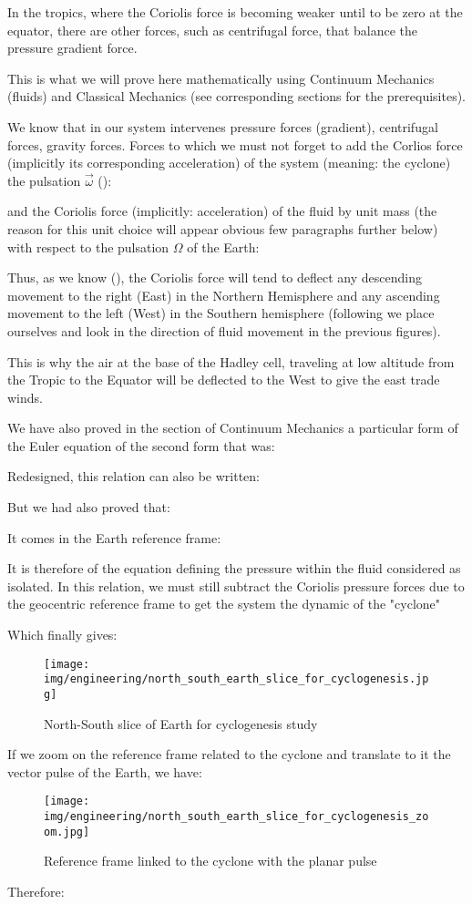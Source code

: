 	In the tropics, where the Coriolis force is becoming weaker until to be zero at the equator, there are other forces, such as centrifugal force, that balance the pressure gradient force.

	This is what we will prove here mathematically using Continuum Mechanics (fluids) and Classical Mechanics (see corresponding sections for the prerequisites).
	
	We know that in our system intervenes pressure forces (gradient), centrifugal forces, gravity forces. Forces to which we must not forget to add the Corlios force (implicitly its corresponding acceleration) of the system (meaning: the cyclone) the pulsation $\vec{\omega}$ ():
	
	and the Coriolis force (implicitly: acceleration) of the fluid by unit mass (the reason for this unit choice will appear obvious few paragraphs further below) with respect to the pulsation $\Omega$ of the Earth:
	
	Thus, as we know (), the Coriolis force will tend to deflect any descending movement to the right (East) in the Northern Hemisphere and any ascending movement to the left (West) in the Southern hemisphere (following we place ourselves and look in the direction of fluid movement in the previous figures).

	This is why the air at the base of the Hadley cell, traveling at low altitude from the Tropic to the Equator will be deflected to the West to give the east trade winds.

	We have also proved in the section of Continuum Mechanics a particular form of the Euler equation of the second form that was:
	
	Redesigned, this relation can also be written:
	
	But we had also proved that:
	
	It comes in the Earth reference frame:
	
	It is therefore of the equation defining the pressure within the fluid considered as isolated. In this relation, we must still subtract the Coriolis pressure  forces due to the geocentric reference frame to get the system the dynamic of the "cyclone"
	
	Which finally gives:
	
	\begin{figure}[H]
		\begin{center}
			\texttt{[image: img/engineering/north\_south\_earth\_slice\_for\_cyclogenesis.jpg]}
		\end{center}	
		\caption[]{North-South slice of Earth for cyclogenesis study}
	\end{figure}
	If we zoom on the reference frame related to the cyclone and translate to it the vector pulse of the Earth, we have:
	\begin{figure}[H]
		\begin{center}
			\texttt{[image: img/engineering/north\_south\_earth\_slice\_for\_cyclogenesis\_zoom.jpg]}
		\end{center}	
		\caption[]{Reference frame linked to the cyclone with the planar pulse}
	\end{figure}
	Therefore:
	
